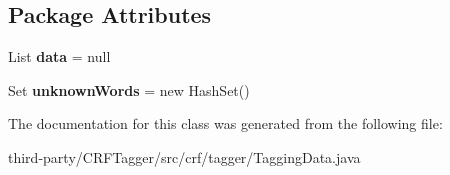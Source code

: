 \subsection*{Package Attributes}
\begin{DoxyCompactItemize}
\item 
\hypertarget{classcrf_1_1tagger_1_1TaggingData_aae012823669c6bd7be674b852ab523b6}{
List {\bfseries data} = null}
\label{classcrf_1_1tagger_1_1TaggingData_aae012823669c6bd7be674b852ab523b6}

\item 
\hypertarget{classcrf_1_1tagger_1_1TaggingData_a70c27f7818ad1c4f913d4467bd2c4ab5}{
Set {\bfseries unknownWords} = new HashSet()}
\label{classcrf_1_1tagger_1_1TaggingData_a70c27f7818ad1c4f913d4467bd2c4ab5}

\end{DoxyCompactItemize}


The documentation for this class was generated from the following file:\begin{DoxyCompactItemize}
\item 
third-\/party/CRFTagger/src/crf/tagger/TaggingData.java\end{DoxyCompactItemize}
